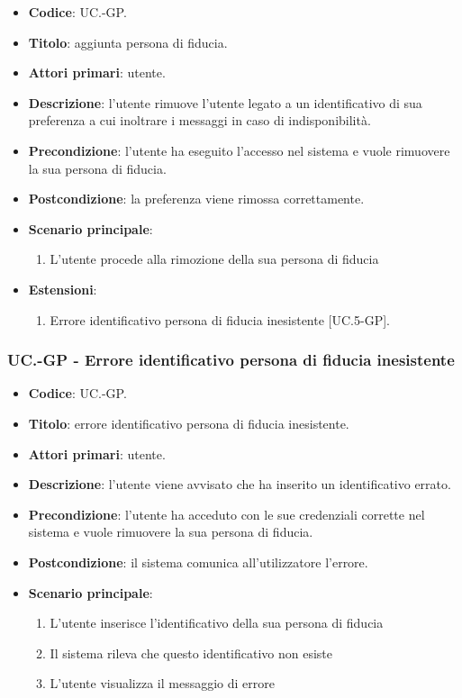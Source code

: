 	\begin{itemize}
		\item \textbf{Codice}: UC\theuccount.\thesubuccount-GP.
		\item \textbf{Titolo}: aggiunta persona di fiducia.
		\item \textbf{Attori primari}: utente.
		\item \textbf{Descrizione}:  l’utente rimuove l'utente legato a un identificativo di sua preferenza a cui inoltrare i messaggi in caso di indisponibilità.
		\item \textbf{Precondizione}: l’utente ha eseguito l'accesso nel sistema e vuole rimuovere la sua persona di fiducia.
		\item \textbf{Postcondizione}: la preferenza viene rimossa correttamente.
		\item \textbf{Scenario principale}:
		\begin{enumerate}
			\item L’utente procede alla rimozione della sua persona di fiducia
		\end{enumerate}
		\item \textbf{Estensioni}:
		\begin{enumerate}
			\item Errore identificativo persona di fiducia inesistente [UC\theuccount.5-GP].
		\end{enumerate}
	\end{itemize}
	
	\subsubsection{UC\theuccount.\thesubuccount-GP - Errore identificativo persona di fiducia inesistente}
	
	\begin{itemize}
		\item \textbf{Codice}: UC\theuccount.\thesubuccount-GP.
		\item \textbf{Titolo}: errore identificativo persona di fiducia inesistente.
		\item \textbf{Attori primari}: utente.
		\item \textbf{Descrizione}: l’utente viene avvisato che ha inserito un identificativo errato.
		\item \textbf{Precondizione}: l’utente ha acceduto con le sue credenziali corrette nel sistema e vuole rimuovere la sua persona di fiducia.
		\item \textbf{Postcondizione}: il sistema comunica all’utilizzatore l’errore.
		\item \textbf{Scenario principale}:
		\begin{enumerate}
			\item L'utente inserisce l'identificativo della sua persona di fiducia
			\item Il sistema rileva che questo identificativo non esiste
			\item L'utente visualizza il messaggio di errore
		\end{enumerate}
	\end{itemize}

